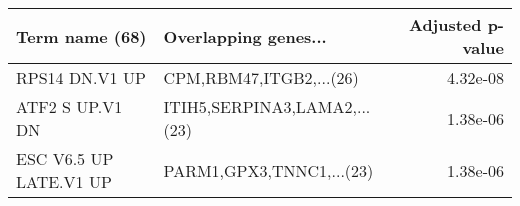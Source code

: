 \begin{tabular}{llr}
\toprule
        Term name (68) &         Overlapping genes... &  Adjusted p-value \\
\midrule
        RPS14 DN.V1 UP &      CPM,RBM47,ITGB2,...(26) &          4.32e-08 \\
       ATF2 S UP.V1 DN & ITIH5,SERPINA3,LAMA2,...(23) &          1.38e-06 \\
ESC V6.5 UP LATE.V1 UP &     PARM1,GPX3,TNNC1,...(23) &          1.38e-06 \\
\bottomrule
\end{tabular}
